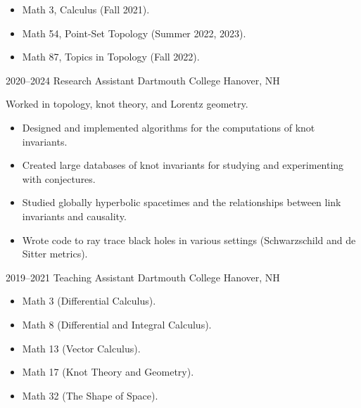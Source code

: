 \documentclass[a4paper,sans]{moderncv}
\begin{document}
            {}
            {%
                \begin{itemize}
                    \item Math 3, Calculus (Fall 2021).
                    \item Math 54, Point-Set Topology (Summer 2022, 2023).
                    \item Math 87, Topics in Topology (Fall 2022).
                \end{itemize}
            }
        \cventry%
            {2020--2024}
            {Research Assistant}
            {Dartmouth College}
            {Hanover, NH}
            {}
            {%
                Worked in topology, knot theory, and Lorentz geometry.
                \begin{itemize}
                    \item
                        Designed and implemented algorithms for the
                        computations of knot invariants.
                    \item
                        Created large databases of knot invariants for studying
                        and experimenting with conjectures.
                    \item
                        Studied globally hyperbolic spacetimes and the
                        relationships between link invariants and causality.
                    \item
                        Wrote code to ray trace black holes in
                        various settings (Schwarzschild and de Sitter metrics).
                \end{itemize}%
             }
        \cventry%
            {2019--2021}
            {Teaching Assistant}
            {Dartmouth College}
            {Hanover, NH}
            {}
            {%
                \begin{itemize}
                    \item
                        Math 3 (Differential Calculus).
                    \item
                        Math 8 (Differential and Integral Calculus).
                    \item
                        Math 13 (Vector Calculus).
                    \item
                        Math 17 (Knot Theory and Geometry).
                    \item
                        Math 32 (The Shape of Space).
                \end{itemize}
            }
\end{document}
